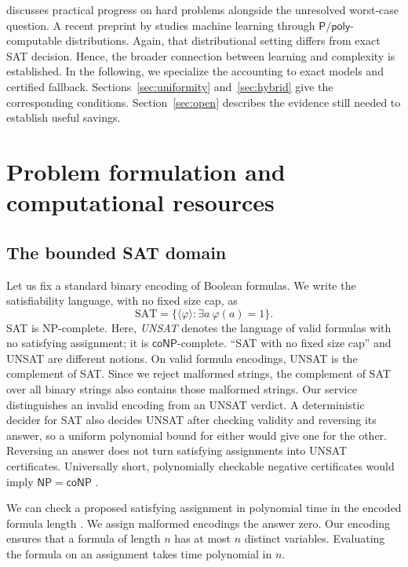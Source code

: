 \documentclass[11pt,a4paper]{article}
\numberwithin{equation}{section}
\newcommand{\NPclass}{\mathsf{NP}}
\newcommand{\coNP}{\mathsf{coNP}}
\newcommand{\Ppoly}{\mathsf{P/poly}}
\newcommand{\SAT}{\mathrm{SAT}}
\theoremstyle{plain}
\theoremstyle{definition}
\theoremstyle{remark}
\begin{document}
\citet{fortnow2022fifty} discusses practical progress on hard problems alongside the unresolved worst-case question. A recent preprint by \citet{fortnow2026manage} studies machine learning through $\Ppoly$-computable distributions. Again, that distributional setting differs from exact SAT decision. Hence, the broader connection between learning and complexity is established. In the following, we specialize the accounting to exact models and certified fallback. Sections~\ref{sec:uniformity} and~\ref{sec:hybrid} give the corresponding conditions. Section~\ref{sec:open} describes the evidence still needed to establish useful savings.

\section{Problem formulation and computational resources}
\label{sec:setup}

\subsection{The bounded SAT domain}

Let us fix a standard binary encoding of Boolean formulas. We write the satisfiability language, with no fixed size cap, as
\begin{equation}
\SAT=\{\langle\varphi\rangle:\exists a\ \varphi(a)=1\}.
\end{equation}
SAT is NP-complete. Here, \emph{UNSAT} denotes the language of valid formulas with no satisfying assignment; it is $\coNP$-complete. ``SAT with no fixed size cap'' and UNSAT are different notions. On valid formula encodings, UNSAT is the complement of SAT. Since we reject malformed strings, the complement of SAT over all binary strings also contains those malformed strings. Our service distinguishes an invalid encoding from an UNSAT verdict. A deterministic decider for SAT also decides UNSAT after checking validity and reversing its answer, so a uniform polynomial bound for either would give one for the other. Reversing an answer does not turn satisfying assignments into UNSAT certificates. Universally short, polynomially checkable negative certificates would imply $\NPclass=\coNP$ \citep{williams2025conp,cook1979}.

We can check a proposed satisfying assignment in polynomial time in the encoded formula length \citep{cook1971}. We assign malformed encodings the answer zero. Our encoding ensures that a formula of length $n$ has at most $n$ distinct variables. Evaluating the formula on an assignment takes time polynomial in $n$.
\end{document}

